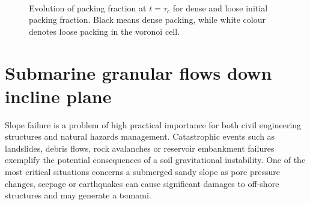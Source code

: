 \begin{figure}
\centering
{}\\
\caption{Evolution of packing fraction at $t = \tau_c$ for dense and loose 
initial packing fraction. Black means dense packing, while white colour denotes 
loose packing in the voronoi cell.}
\label{fig:Dense_Loose_voro}
\end{figure}

\clearpage


\section{Submarine granular flows down incline plane}

Slope failure is a problem of high practical importance for both civil 
engineering structures and natural hazards management. Catastrophic events such 
as landslides, debris flows, rock avalanches or reservoir embankment failures 
exemplify the potential consequences of a soil gravitational instability. One 
of the most critical situations concerns a submerged sandy slope as pore 
pressure changes, seepage or earthquakes can cause significant damages to 
off-shore structures and may generate a tsunami.

